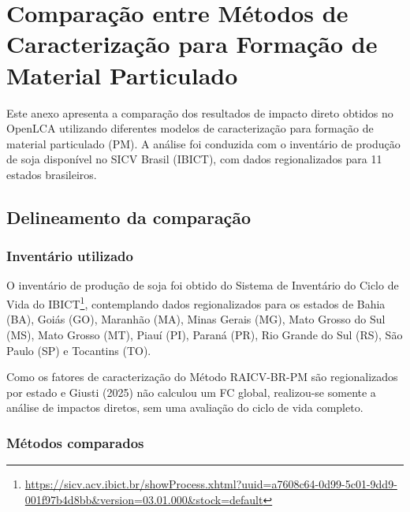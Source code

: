 
\section{Compara\c{c}\~ao entre M\'etodos de Caracteriza\c{c}\~ao para Forma\c{c}\~ao de Material Particulado}
\label{anexo:comparacao-metodos}

Este anexo apresenta a compara\c{c}\~ao dos resultados de impacto direto obtidos no OpenLCA utilizando diferentes modelos de caracteriza\c{c}\~ao para forma\c{c}\~ao de material particulado (PM). A an\'alise foi conduzida com o invent\'ario de produ\c{c}\~ao de soja dispon\'ivel no SICV Brasil (IBICT), com dados regionalizados para 11 estados brasileiros.

\subsection{Delineamento da compara\c{c}\~ao}

\subsubsection{Invent\'ario utilizado}

O invent\'ario de produ\c{c}\~ao de soja foi obtido do Sistema de Invent\'ario do Ciclo de Vida do IBICT\footnote{\url{https://sicv.acv.ibict.br/showProcess.xhtml?uuid=a7608c64-0d99-5c01-9dd9-001f97b4d8bb&version=03.01.000&stock=default}}, contemplando dados regionalizados para os estados de Bahia (BA), Goi\'as (GO), Maranh\~ao (MA), Minas Gerais (MG), Mato Grosso do Sul (MS), Mato Grosso (MT), Piau\'i (PI), Paran\'a (PR), Rio Grande do Sul (RS), S\~ao Paulo (SP) e Tocantins (TO).

Como os fatores de caracteriza\c{c}\~ao do Método RAICV-BR-PM s\~ao regionalizados por estado e Giusti (2025) n\~ao calculou um FC global, realizou-se somente a an\'alise de impactos diretos, sem uma avaliação do ciclo de vida completo.

\subsubsection{M\'etodos comparados}

